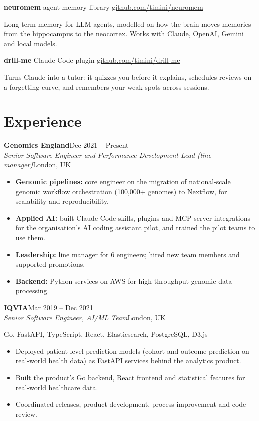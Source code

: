 \documentclass[a4paper,10pt]{article}
\newcommand{\role}[4]{%
  {\bfseries #1}\hfill{\color{muted}#4}\\
  {\itshape #3}\hfill{\color{muted}\small #2}\par}
\newcommand{\stack}[1]{{\color{muted}\small #1}\par}
\newcommand{\gap}{\vspace{8pt}}
\begin{document}
\textbf{neuromem} {\color{muted}\small agent memory library} \hfill {\small\href{https://github.com/timini/neuromem}{\color{accent}github.com/timini/neuromem}}\par
Long-term memory for LLM agents, modelled on how the brain moves memories from the hippocampus to the neocortex. Works with Claude, OpenAI, Gemini and local models.
\gap

\textbf{drill-me} {\color{muted}\small Claude Code plugin} \hfill {\small\href{https://github.com/timini/drill-me}{\color{accent}github.com/timini/drill-me}}\par
Turns Claude into a tutor: it quizzes you before it explains, schedules reviews on a forgetting curve, and remembers your weak spots across sessions.

\section{Experience}

\role{Genomics England}{London, UK}{Senior Software Engineer and Performance Development Lead (line manager)}{Dec 2021 -- Present}
\begin{itemize}
  \item \textbf{Genomic pipelines:} core engineer on the migration of national-scale genomic workflow orchestration (100,000+ genomes) to Nextflow, for scalability and reproducibility.
  \item \textbf{Applied AI:} built Claude Code skills, plugins and MCP server integrations for the organisation's AI coding assistant pilot, and trained the pilot teams to use them.
  \item \textbf{Leadership:} line manager for 6 engineers; hired new team members and supported promotions.
  \item \textbf{Backend:} Python services on AWS for high-throughput genomic data processing.
\end{itemize}
\gap

\role{IQVIA}{London, UK}{Senior Software Engineer, AI/ML Team}{Mar 2019 -- Dec 2021}
\stack{Go, FastAPI, TypeScript, React, Elasticsearch, PostgreSQL, D3.js}
\begin{itemize}
  \item Deployed patient-level prediction models (cohort and outcome prediction on real-world health data) as FastAPI services behind the analytics product.
  \item Built the product's Go backend, React frontend and statistical features for real-world healthcare data.
  \item Coordinated releases, product development, process improvement and code review.
\end{itemize}
\gap
\end{document}
